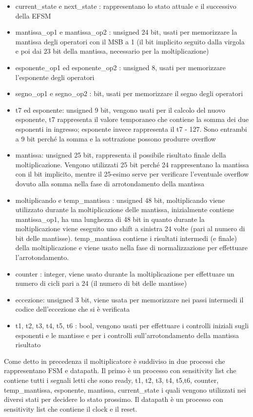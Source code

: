 \documentclass[]{IEEEtran}
\begin{document}
\begin{itemize}
	\item current\_state e next\_state : rappresentano lo stato attuale e il successivo della EFSM
	\item mantissa\_op1 e mantissa\_op2 : unsigned 24 bit, usati per memorizzare la mantissa degli operatori con il MSB a 1 (il bit implicito seguito dalla virgola e poi dai 23 bit della mantissa, necessario per la moltiplicazione)
	\item esponente\_op1 ed esponente\_op2 : unsigned 8, usati per memorizzare l’esponente degli operatori
	\item segno\_op1 e segno\_op2 : bit, usati per memorizzare il segno degli operatori
	\item t7 ed esponente: unsigned 9 bit, vengono usati per il calcolo del nuovo esponente, t7 rappresenta il valore temporaneo che contiene la somma dei due esponenti in ingresso; esponente invece rappresenta il t7 - 127. Sono entrambi a 9 bit perché la somma e la sottrazione possono produrre overflow
	\item mantissa: unsigned 25 bit, rappresenta il possibile risultato finale della moltiplicazione. Vengono utilizzati 25 bit perché 24 rappresentano la mantissa con il bit implicito, mentre il 25-esimo serve per verificare l’eventuale overflow dovuto alla somma nella fase di arrotondamento della mantissa
	\item moltiplicando e temp\_mantissa : unsigned 48 bit, moltiplicando viene utilizzato durante la moltiplicazione delle mantissa, inizialmente contiene mantissa\_op1, ha una lunghezza di 48 bit in quanto durante la moltiplicazione viene eseguito uno shift a sinistra 24 volte (pari al numero di bit delle mantisse). temp\_mantissa contiene i risultati intermedi (e finale) della moltiplicazione e viene usato nella fase di normalizzazione per effettuare l’arrotondamento.
	\item counter : integer, viene usato durante la moltiplicazione per effettuare un numero di cicli pari a 24 (il numero di bit delle mantisse)
	\item eccezione: unsigned 3 bit, viene usata per memorizzare nei passi intermedi il codice dell’eccezione che si è verificata
	\item t1, t2, t3, t4, t5, t6 : bool, vengono usati per effettuare i controlli iniziali sugli esponenti e le mantisse e per i controlli sull’arrotondamento della mantissa risultato
\end{itemize}
Come detto in precedenza il moltiplicatore è suddiviso in due processi che rappresentano FSM e datapath. Il primo è un processo con sensitivity list che contiene tutti i segnali letti che sono ready, t1, t2, t3, t4, t5,t6, counter, temp\_mantissa, esponente, mantissa, current\_state i quali vengono utilizzati nei diversi stati per decidere lo stato prossimo. Il datapath è un processo con sensitivity list che contiene il clock e il reset.
\end{document}
